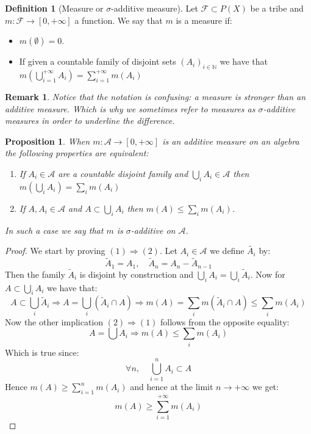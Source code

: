 \documentclass[10pt,a4paper]{book}
\newtheorem{proposition}{Proposition}[section]
\newtheorem*{remark}{Remark}
\theoremstyle{definition}
\newtheorem{definition}{Definition}[section]
\begin{document}
\begin{definition}[Measure or $\sigma$-additive measure]

Let $\mathcal{F} \subset P(X)$ be a tribe and $m : \mathcal{F} \to [0, +\infty]$ a function. We say that $m$ is a measure if:
\begin{itemize}
\item $m(\emptyset) = 0$.
\item If given a countable family of disjoint sets $(A_i)_{i \in \mathbb{N}}$ we have that $m(\bigcup_{i = 1}^{+\infty} A_i) = \sum_{i = 1}^{+\infty} m(A_i)$
\end{itemize}

\end{definition}

\begin{remark}

Notice that the notation is confusing: a measure is stronger than an additive measure. Which is why we sometimes refer to measures as $\sigma$-additive measures in order to underline the difference.

\end{remark}

\begin{proposition}

When $m : \mathcal{A} \to [0, +\infty]$ is an additive measure on an algebra the following properties are equivalent:
\begin{enumerate}
\item If $A_i \in \mathcal{A}$ are a countable disjoint family and $\bigcup_i A_i \in \mathcal{A}$  then $m(\bigcup_i A_i) = \sum_i m(A_i)$
\item If $A, A_i \in \mathcal{A}$ and $A \subset \bigcup_i A_i$ then $m(A) \leq \sum_i m(A_i)$.
\end{enumerate}
In such a case we say that $m$ is $\sigma$-additive on $\mathcal{A}$.
\end{proposition}

\begin{proof}
We start by proving $(1) \Rightarrow (2)$. Let $A_i \in \mathcal{A}$ we define $\tilde{A_i}$ by:
\[
\tilde{A}_1 = A_1, \quad \tilde{A}_n = A_n - \tilde{A}_{n-1}
\]
Then the family $\tilde{A}_i$ is disjoint by construction and $\bigcup_i A_i = \bigcup_i \tilde{A}_i$. Now for $A \subset \bigcup_i A_i$ we have that:
\[
A \subset \bigcup_i \tilde{A}_i \Rightarrow A = \bigcup_i \left(\tilde{A}_i \cap A\right) \Rightarrow m(A) = \sum_i m(\tilde{A}_i \cap A) \leq \sum_i m(A_i)
\]
Now the other implication $(2) \Rightarrow (1)$ follows from the opposite equality:
\[
A = \bigcup A_i \Rightarrow m(A) \leq \sum_i m(A_i)
\]
Which is true since:
\[
\forall n, \quad \bigcup_{i = 1}^n A_i \subset A
\]
Hence $m(A) \geq \sum_{i = 1}^n m(A_i)$ and hence at the limit $n \to +\infty$ we get:
\[
m(A) \geq \sum_{i = 1}^{+\infty} m(A_i)
\]
\end{proof}
\end{document}
